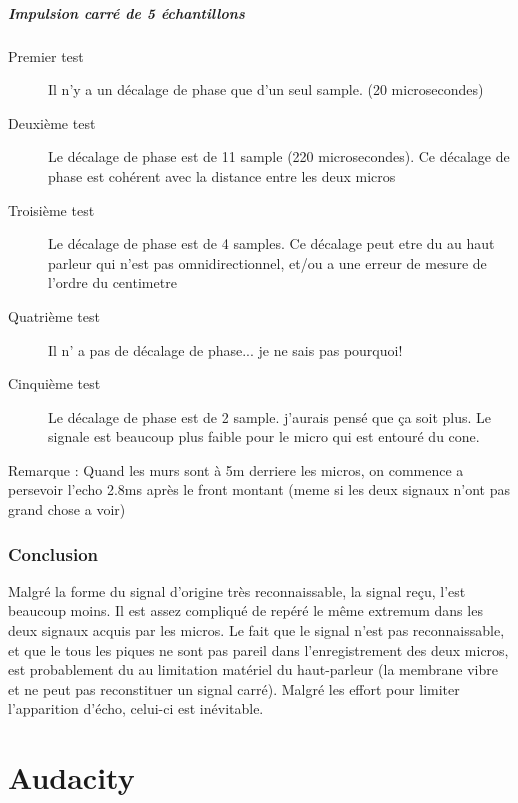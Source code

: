 \documentclass[12pt,a4paper]{report}
\begin{document}
\paragraph{Impulsion carré de 5 échantillons}
\begin{description}
\item[Premier test] Il n'y a un décalage de phase que d'un seul sample. (20 microsecondes)
\item[Deuxième test] Le décalage de phase est de 11 sample (220 microsecondes). Ce décalage de phase est cohérent avec la distance entre les deux micros
\item[Troisième test] Le décalage de phase est de 4 samples.  Ce décalage peut etre du au haut parleur qui n'est pas omnidirectionnel, et/ou a une erreur de mesure de l'ordre du centimetre
\item[Quatrième test] Il n' a pas de décalage de phase... je ne sais pas pourquoi!
\item[Cinquième test] Le décalage de phase est de 2 sample. j'aurais pensé que ça soit plus. Le signale est beaucoup plus faible pour le micro qui est entouré du cone. 
\end{description}
\begin{huge}
Remarque : Quand les murs sont à 5m derriere les micros, on commence a persevoir l'echo 2.8ms après le front montant (meme si les deux signaux n'ont pas grand chose a voir)
\end{huge}

\subsection{Conclusion}
Malgré la forme du signal d'origine très reconnaissable, la signal reçu, l'est beaucoup moins. Il est assez compliqué de repéré le même extremum dans les deux signaux acquis par les micros. Le fait que le signal n'est pas reconnaissable, et que le tous les piques ne sont pas pareil dans l'enregistrement des deux micros, est probablement du au limitation matériel du haut-parleur (la membrane vibre et ne peut pas reconstituer un signal carré). Malgré les effort pour limiter l'apparition d'écho, celui-ci est inévitable.
	
	
\appendix
\chapter{Audacity}
\end{document}
